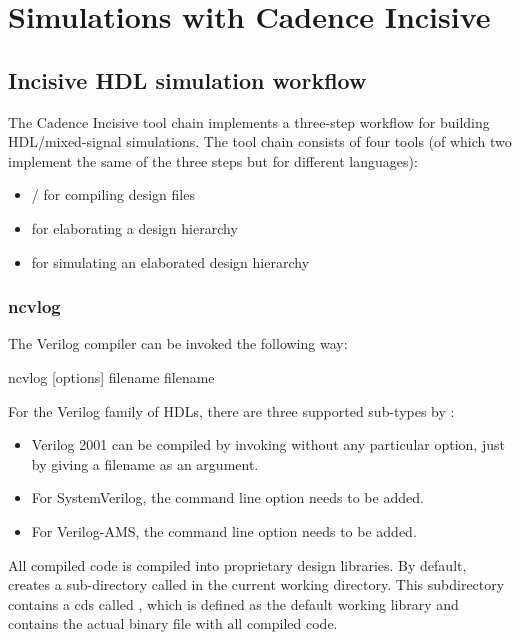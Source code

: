 \chapter{Simulations with Cadence Incisive}
\label{chap:incisive}
\section{Incisive HDL simulation workflow}
The Cadence Incisive tool chain implements a three-step workflow for building
\gls{HDL}/mixed-signal simulations. The tool chain consists of four tools (of
which two implement the same of the three steps but for different languages):
\begin{itemize}
	\item {}/ for compiling design files
	\item {} for elaborating a design hierarchy
	\item {} for simulating an elaborated design hierarchy
\end{itemize}

\subsection{ncvlog}
The Verilog compiler  can be invoked the following way:
\begin{lstbashplain}
 ncvlog [options] filename { filename }
\end{lstbashplain}
For the Verilog family of \glspl{HDL}, there are three supported sub-types by
:
\begin{itemize}
	\item Verilog 2001 can be compiled by invoking  without any
		particular option, just by giving a filename as an argument.
	\item For SystemVerilog, the command line option  needs to be
		added.
	\item For Verilog-AMS, the command line option  needs to be
		added.
\end{itemize}

All compiled code is compiled into proprietary design libraries. By default,
 creates a sub-directory called  in the current
working directory. This subdirectory contains a \gls{cds} called ,
which is defined as the default working library and contains the actual binary
file with all compiled code.


